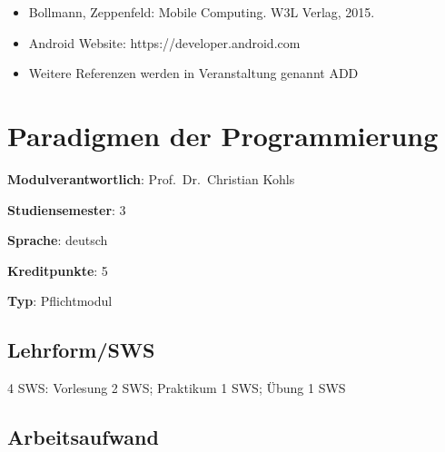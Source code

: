 \begin{itemize}
\tightlist
\item
  Bollmann, Zeppenfeld: Mobile Computing. W3L Verlag, 2015.
\item
  Android Website: https://developer.android.com
\item
  Weitere Referenzen werden in Veranstaltung genannt ADD
\end{itemize}

\hypertarget{paradigmen-der-programmierungpathlabelmi-2017modulbeschreibungen-bachelorba_paradigmen-der-programmierung}{%
\chapter{Paradigmen der
Programmierung\label{/mi-2017/modulbeschreibungen-bachelor/BA_Paradigmen-der-Programmierung}}\label{paradigmen-der-programmierungpathlabelmi-2017modulbeschreibungen-bachelorba_paradigmen-der-programmierung}}

\begin{modulHead}
\textbf{Modulverantwortlich}: Prof.~Dr.~Christian
Kohls
\end{modulHead}
\begin{modulHead}
\textbf{Studiensemester}:
3
\end{modulHead}
\begin{modulHead}
\textbf{Sprache}:
deutsch
\end{modulHead}
\begin{modulHead}
\textbf{Kreditpunkte}:
5
\end{modulHead}
\begin{modulHead}
\textbf{Typ}:
Pflichtmodul
\end{modulHead}


\hypertarget{lehrformswspathlabelmi-2017modulbeschreibungen-bachelorba_paradigmen-der-programmierung}{%
\section*{Lehrform/SWS\label{/mi-2017/modulbeschreibungen-bachelor/BA_Paradigmen-der-Programmierung}}\label{lehrformswspathlabelmi-2017modulbeschreibungen-bachelorba_paradigmen-der-programmierung}}

4 SWS: Vorlesung 2 SWS; Praktikum 1 SWS; Übung 1 SWS

\hypertarget{arbeitsaufwandpathlabelmi-2017modulbeschreibungen-bachelorba_paradigmen-der-programmierung}{%
\section*{Arbeitsaufwand\label{/mi-2017/modulbeschreibungen-bachelor/BA_Paradigmen-der-Programmierung}}\label{arbeitsaufwandpathlabelmi-2017modulbeschreibungen-bachelorba_paradigmen-der-programmierung}}

